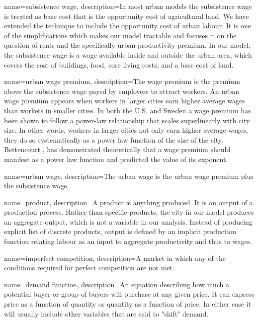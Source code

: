 {
name=subsistence wage,
description={In most urban models the subsistence wage is treated as base cost that is the opportunity cost of agricultural land. We have extended the technique to include the opportunity cost of urban labour. It is one of the simplifications which makes our model tractable and focuses it on the question of rents and the specifically urban productivity premium. In our model, the subsistence wage is a wage available inside and outside the urban area, which covers the cost of buildings, food, core living costs, and a base cost of land.}
}

{
name=urban wage premium,
description={The wage premium is the premium above the \gls{subsistence wage} payed by employers to attract workers. An urban wage premium appears when workers in larger cities earn higher average wages than workers in smaller cities. In both the U.S. and Sweden a wage premium has been shown to follow a power-law relationship that scales superlinearly with city size. In other words, workers in larger cities not only earn higher average wages, they do so systematically as a power law function of the size of the city. Bettencourt  \cite{bettencourtIntroductionUrbanScience2021}, has demonstrated theoretically that a wage premium should manifest as a power law function and predicted the value of its exponent.}
}

{
name=urban wage,
description={The \gls{urban wage} is the \gls{urban wage premium} plus the \gls{subsistence wage}.}
}

{
name=product,
description={A product is anything produced. It is an \gls{output} of a production process. %
Rather than specific products, the city in our model produces an aggregate output, which is not a variable in our analysis. Instead of producing explicit list of discrete products, output is defined by an implicit production function relating labour as an input to aggregate productivity and thus to wages. %
}
}

{
name=imperfect competition,
description={A market in which any of the conditions required for \gls{perfect competition} are not met.}
}



{
name=demand function,
description={An equation describing how much a potential buyer or group of buyers will purchase at any given price. It can express price as a function of quantity or quantity as a function of price. In either case it will usually include other variables that are said to "shift" demand.   }
}

